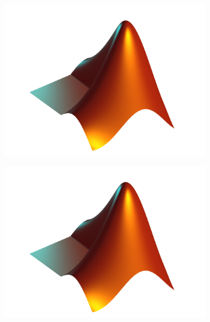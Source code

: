 	\begin{figure}[H]
		\centering
		\begin{subfigure}[b]{\twofig\textwidth}
			\includegraphics{../matlab/fig/examples/matlab-logo-with-ffsp.pdf}
		\end{subfigure}
		\hfil
		\begin{subfigure}[b]{\twofig\textwidth}
			\includegraphics{../matlab/fig/examples/matlab-logo-with-ffsp.pdf}
		\end{subfigure}
		\\
		\begin{subfigure}[b]{\twofig\textwidth}

\end{subfigure}
\end{figure}
